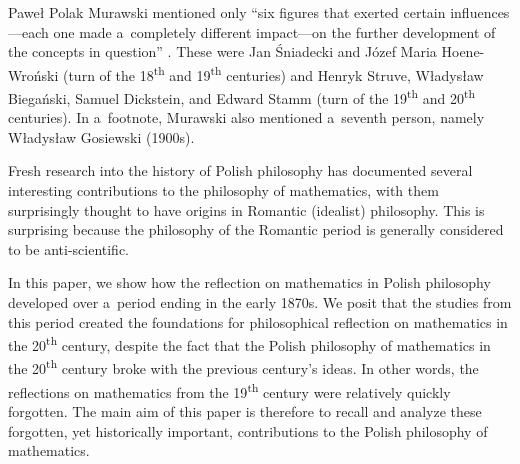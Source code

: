 \begin{artengenv}{Paweł Polak}
Murawski mentioned only ``six figures that exerted certain influences---each one made a~completely different impact---on the further development of the concepts in question''
\parencite[][p.1]{murawski_philosophy_2014}. %
 These were Jan Śniadecki and Józef Maria Hoene-Wroński (turn of the 18\textsuperscript{th} and 19\textsuperscript{th} centuries) and Henryk Struve, Władysław Biegański, Samuel Dickstein, and Edward Stamm (turn of the 19\textsuperscript{th} and 20\textsuperscript{th} centuries). In a~footnote, Murawski also mentioned a~seventh person, namely Władysław Gosiewski (1900s).

Fresh research into the history of Polish philosophy has documented several interesting contributions to the philosophy of mathematics, with them surprisingly thought to have origins in Romantic (idealist) philosophy. This is surprising because the philosophy of the Romantic period is generally considered to be anti-scientific.

In this paper, we show how the reflection on mathematics in Polish philosophy developed over a~period ending in the early 1870s. We posit that the studies from this period created the foundations for philosophical reflection on mathematics in the 20\textsuperscript{th} century, despite the fact that the Polish philosophy of mathematics in the 20\textsuperscript{th} century broke with the previous century's ideas. In other words, the reflections on mathematics from the 19\textsuperscript{th} century were relatively quickly forgotten. The main aim of this paper is therefore to recall and analyze these forgotten, yet historically important, contributions to the Polish philosophy of mathematics.


\end{artengenv}
